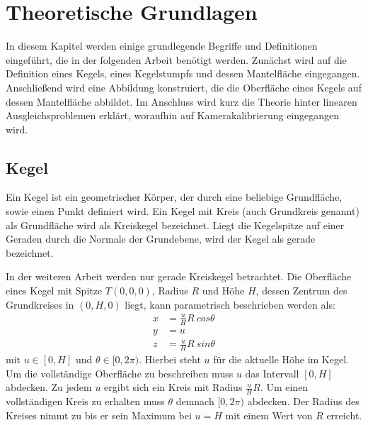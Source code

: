 \chapter{Theoretische Grundlagen}
\label{ch:theory}
In diesem Kapitel werden einige grundlegende Begriffe und Definitionen eingeführt, die in der folgenden Arbeit benötigt werden.
Zunächst wird auf die Definition eines Kegels, eines Kegelstumpfs und dessen Mantelfläche eingegangen. 
Anschließend wird eine Abbildung konstruiert, die die Oberfläche eines Kegels auf dessen Mantelfläche abbildet. 
Im Anschluss wird kurz die Theorie hinter linearen Ausgleichsproblemen erklärt, woraufhin auf Kamerakalibrierung eingegangen wird. 

\section{Kegel}
\label{s:cone}

\begin{definition}[Kegel]
	Ein Kegel ist ein geometrischer Körper, der durch eine beliebige Grundfläche, sowie einen Punkt definiert wird.
	Ein Kegel mit Kreis (auch Grundkreis genannt) als Grundfläche wird als Kreiskegel bezeichnet. Liegt die Kegelspitze auf einer Geraden durch die Normale der Grundebene, wird der Kegel als gerade bezeichnet.
\end{definition}

In der weiteren Arbeit werden nur gerade Kreiskegel betrachtet. Die Oberfläche eines Kegel mit Spitze $T(0,0,0)$, Radius $R$ und Höhe $H$, dessen Zentrum des Grundkreises in $(0,H,0)$ liegt, kann parametrisch beschrieben werden als:
\begin{equation} \label{eq:paramCone}
\begin{aligned}
x &= \frac{u}{H} R~cos \theta \\
y &= u \\
z &= \frac{u}{H} R~sin \theta
\end{aligned}
\end{equation} %
mit $u\in [0, H]$ und $\theta \in [0, 2\pi)$. Hierbei steht $u$ für die aktuelle Höhe im Kegel. Um die vollständige Oberfläche zu beschreiben muss $u$ das Intervall $[0, H]$ abdecken. Zu jedem $u$ ergibt sich ein Kreis mit Radius $\frac{u}{H} R$. Um einen vollständigen Kreis zu erhalten muss $\theta$ demnach $[0, 2\pi)$ abdecken. Der Radius des Kreises nimmt zu bis er sein Maximum bei $u = H$ mit einem Wert von $R$ erreicht. 

